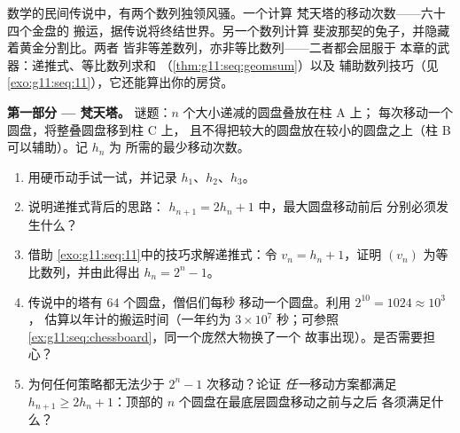 \begin{problem}
\label{pb:g11:seq:1}
数学的民间传说中，有两个数列独领风骚。一个计算
梵天塔的移动次数——六十四个金盘的
搬运，据传说将终结世界。另一个数列计算
斐波那契的兔子，并隐藏着黄金分割比。两者
皆非等差数列，亦非等比数列——二者都会屈服于
本章的武器：递推式、等比数列求和
（\cref{thm:g11:seq:geomsum}）以及
辅助数列技巧（见\cref{exo:g11:seq:11}），它还能算出你的房贷。

\medskip
\noindent\textbf{第一部分 --- 梵天塔。}
谜题：$n$ 个大小递减的圆盘叠放在柱 A 上；
每次移动一个圆盘，将整叠圆盘移到柱 C 上，
且不得把较大的圆盘放在较小的圆盘之上（柱 B 可以辅助）。记 $h_n$ 为
所需的最少移动次数。
\begin{enumerate}
  \item 用硬币动手试一试，并记录 $h_1$、$h_2$、$h_3$。
  \item 说明递推式背后的思路：
        $h_{n+1} = 2h_n + 1$ 中，最大圆盘移动前后
        分别必须发生什么？
  \item 借助
        \cref{exo:g11:seq:11}中的技巧求解递推式：令 $v_n = h_n + 1$，证明
        $(v_n)$ 为等比数列，并由此得出 $h_n = 2^n - 1$。
  \item 传说中的塔有 $64$ 个圆盘，僧侣们每秒
        移动一个圆盘。利用 $2^{10} = 1024 \approx 10^3$，
        估算以年计的搬运时间（一年约为
        $3 \times 10^7$ 秒；可参照
        \cref{ex:g11:seq:chessboard}，同一个庞然大物换了一个
        故事出现）。是否需要担心？
  \item 为何任何策略都无法少于 $2^n - 1$ 次移动？论证
        \emph{任一}移动方案都满足
        $h_{n+1} \geq 2 h_n + 1$：顶部的
        $n$ 个圆盘在最底层圆盘移动之前与之后
        各须满足什么？
\end{enumerate}


\end{problem}
